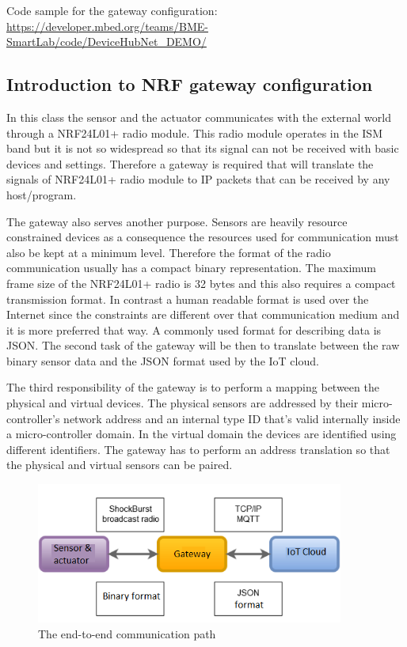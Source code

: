 \documentclass[a4paper]{article}
\begin{document}
Code sample for the gateway configuration:
\url{https://developer.mbed.org/teams/BME-SmartLab/code/DeviceHubNet_DEMO/}

\subsection{Introduction to NRF gateway configuration}

In this class the sensor and the actuator communicates with the external world through
a NRF24L01+ radio module. This radio module operates in the ISM band but it is not so
widespread so that its signal can not be received with basic devices and settings. Therefore a
gateway is required that will translate the signals of NRF24L01+ radio module to IP packets
that can be received by any host/program.

The gateway also serves another purpose. Sensors are heavily resource constrained devices as
a consequence the resources used for communication must also be kept at a minimum level.
Therefore the format of the radio communication usually has a compact binary representation.
The maximum frame size of the NRF24L01+ radio is 32 bytes and this also requires a compact transmission
format. In contrast a human readable format is used over the Internet since
the constraints are different over that communication medium and it is more preferred that way.
A commonly used format for describing data is JSON. The second task of the gateway will be then
to translate between the raw binary sensor data and the JSON format used by the IoT cloud.

The third responsibility of the gateway is to perform a mapping between the physical and virtual
devices. The physical sensors are addressed by their micro-controller's network address and an
internal type ID that's valid internally inside a micro-controller domain.
In the virtual domain the devices are identified using different identifiers. The gateway
has to perform an address translation so that the physical and virtual sensors can be paired.

\begin{figure}[H]
    \centering
    \includegraphics[width=0.9\textwidth]{figures/gateway.png}
    \caption{The end-to-end communication path}
    \label{fig:gateway}
\end{figure}
\end{document}
